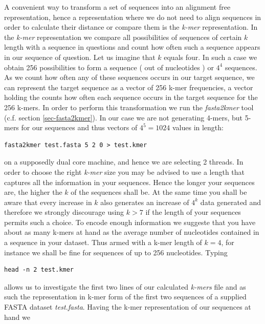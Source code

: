 A convenient way to transform a set of sequences into an alignment
free representation, hence a representation where we do not need to
align sequences in order to calculate their distance or compare them
is the \emph{k-mer} representation. In the \emph{k-mer}
representation we compare all possibilities of sequences of certain $k$
length with a sequence in questions and count how often such a
sequence appears in our sequence of question. Let us imagine that $k$ equals
four. In such a case we obtain 256 possibilities to form a sequence ( out of
nucleotides ) or $4^4$ sequences. As we count how often any of these
sequences occurs in our target sequence, we can represent the target
sequence as a vector of 256 k-mer frequencies, a vector holding the
counts how often each sequence occurs in the target sequence for the
256 k-mers.
In order to perform this transformation we run the
\emph{fasta2kmer} tool (c.f. section \ref{sec-fasta2kmer}). In our case
we are not generating 4-mers, but 5-mers for our sequences and thus
vectors of $4^{5}=1024$ values in length:
\begin{lstlisting}
fasta2kmer test.fasta 5 2 0 > test.kmer
\end{lstlisting}
on a supposedly dual core machine, and hence we are selecting 2
threads. In order to
choose the right \emph{k-mer} size you may be advised to use a length
that captures all the information in your sequences. Hence the longer your
sequences are, the higher the $k$ of the sequences shall be. At the
same time you shall be aware that every increase in $k$ also generates
an increase of $4^{k}$ data generated and
therefore we strongly discourage using $k > 7$ if the length of
your sequences permits such a choice.
To encode enough information we suggeste
that you have about as many k-mers at hand as the average number of
nucleotides contained in a sequence in your dataset.
Thus armed with a k-mer length of $k=4$, for instance we shall
be fine for sequences of up to 256 nucleotides.
Typing
\begin{lstlisting}
head -n 2 test.kmer
\end{lstlisting}
allows us to investigate the first two lines of our calculated \emph{k-mers}
file and as such the representation in k-mer form of the first two
sequences of a supplied FASTA dataset \emph{test.fasta}.
Having the k-mer representation of our sequences at hand we
